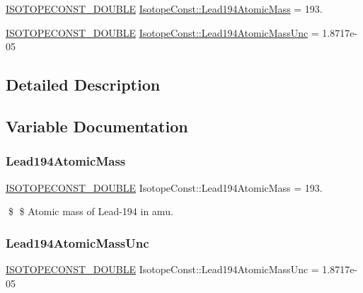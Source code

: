 \begin{DoxyCompactItemize}
\item 
\mbox{\hyperlink{group___isotope_const-_macros_ga8f45a7272ce02c0b4c65c44636ed719a}{I\+S\+O\+T\+O\+P\+E\+C\+O\+N\+S\+T\+\_\+\+D\+O\+U\+B\+LE}} \mbox{\hyperlink{group___isotope_const-_lead-_pb194_ga440f8efb49e6fb604beb117f641e59bd}{Isotope\+Const\+::\+Lead194\+Atomic\+Mass}} = 193.
\item 
\mbox{\hyperlink{group___isotope_const-_macros_ga8f45a7272ce02c0b4c65c44636ed719a}{I\+S\+O\+T\+O\+P\+E\+C\+O\+N\+S\+T\+\_\+\+D\+O\+U\+B\+LE}} \mbox{\hyperlink{group___isotope_const-_lead-_pb194_gade04aed1b435bcfff69c36d9abc5eaa3}{Isotope\+Const\+::\+Lead194\+Atomic\+Mass\+Unc}} = 1.\+8717e-\/05
\end{DoxyCompactItemize}


\subsection{Detailed Description}


\subsection{Variable Documentation}
\mbox{\label{group___isotope_const-_lead-_pb194_ga440f8efb49e6fb604beb117f641e59bd}} 
\subsubsection{\texorpdfstring{Lead194\+Atomic\+Mass}{Lead194AtomicMass}}
{\footnotesize\ttfamily \mbox{\hyperlink{group___isotope_const-_macros_ga8f45a7272ce02c0b4c65c44636ed719a}{I\+S\+O\+T\+O\+P\+E\+C\+O\+N\+S\+T\+\_\+\+D\+O\+U\+B\+LE}} Isotope\+Const\+::\+Lead194\+Atomic\+Mass = 193.}

\$ \$ Atomic mass of Lead-\/194 in amu. \mbox{\label{group___isotope_const-_lead-_pb194_gade04aed1b435bcfff69c36d9abc5eaa3}} 
\subsubsection{\texorpdfstring{Lead194\+Atomic\+Mass\+Unc}{Lead194AtomicMassUnc}}
{\footnotesize\ttfamily \mbox{\hyperlink{group___isotope_const-_macros_ga8f45a7272ce02c0b4c65c44636ed719a}{I\+S\+O\+T\+O\+P\+E\+C\+O\+N\+S\+T\+\_\+\+D\+O\+U\+B\+LE}} Isotope\+Const\+::\+Lead194\+Atomic\+Mass\+Unc = 1.\+8717e-\/05}

